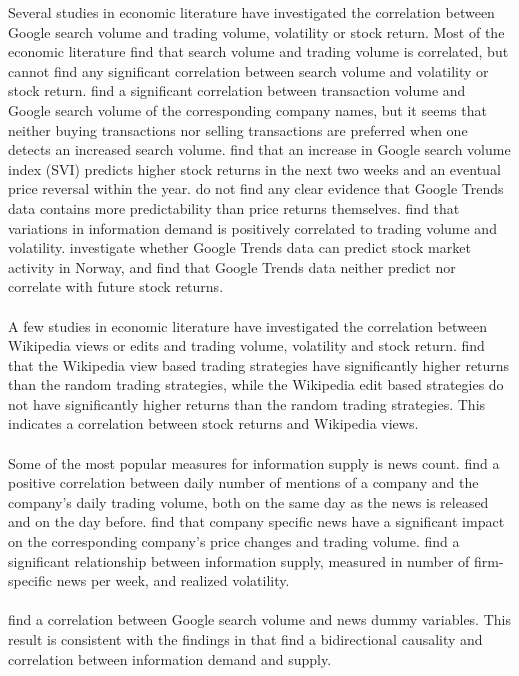 Several studies in economic literature have investigated the correlation between Google search volume and trading volume, volatility or stock return. Most of the economic literature find that search volume and trading volume is correlated, but cannot find any significant correlation between search volume and volatility or stock return. \cite{preis} find a significant correlation between transaction volume and Google search volume of the corresponding company names, but it seems that neither buying transactions nor selling transactions are preferred when one detects an increased search volume. \cite{engelberg} find that an increase in Google search volume index (SVI) predicts higher stock returns in the next two weeks and an eventual price reversal within the year. \cite{challet2014} do not find any clear evidence that Google Trends data contains more predictability than price returns themselves. \cite{vlastakis} find that variations in information demand is positively correlated to trading volume and volatility. \cite{neri} investigate whether Google Trends data can predict stock market activity in Norway, and find that Google Trends data neither predict nor correlate with future stock returns.  
\\\\
A few studies in economic literature have investigated the correlation between Wikipedia views or edits and trading volume, volatility and stock return. \cite{moat} find that the Wikipedia view based trading strategies have significantly higher returns than the random trading strategies, while the Wikipedia edit based strategies do not have significantly higher returns than the random trading strategies. This indicates a correlation between stock returns and Wikipedia views.  
\\\\
Some of the most popular measures for information supply is news count. \cite{preis2013} find a positive correlation between daily number of mentions of a company and the company's daily trading volume, both on the same day as the news is released and on the day before. \cite{ryan} find that company specific news have a significant impact on the corresponding company's price changes and trading volume. \cite{vlastakis} find a significant relationship between information supply, measured in number of firm-specific news per week, and realized volatility. 
\\\\
\cite{engelberg} find a correlation between Google search volume and news dummy variables. This result is consistent with the findings in \cite{vlastakis} that find a bidirectional causality and correlation between information demand and supply. 

